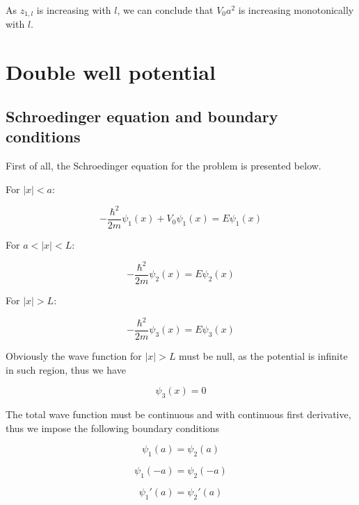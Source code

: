 \documentclass{article}
\begin{document}
As \(z_{1,l} \) is increasing with \(l\), we can conclude that \(V_0a^2\) is increasing monotonically with \(l\).

\section{Double well potential}

\subsection{Schroedinger equation and boundary conditions}
First of all, the Schroedinger equation for the problem is presented below.

For \(\left|x\right| < a\):

\begin{equation}
\label{eq:schr1}
-\frac{\hbar^2}{2m}\psi_{1}(x) + V_{0}\psi_{1}(x) = E\psi_{1}(x)
\end{equation}

For \(a < \left|x\right| < L\):

\begin{equation}
\label{eq:schr2}
-\frac{\hbar^2}{2m}\psi_{2}(x) = E\psi_{2}(x)
\end{equation}

For \(\left|x\right| > L\):

\begin{equation}
\label{eq:schr3}
-\frac{\hbar^2}{2m}\psi_{3}(x) = E\psi_{3}(x)
\end{equation}

Obviously the wave function for \(\left|x\right| > L\) must be null, as the potential is infinite in such region, thus we have

\begin{equation}
\psi_{3}(x) = 0
\end{equation}

The total wave function must be continuous and with continuous first derivative, thus we impose the following boundary conditions

\begin{equation}
\label{eq:continuity}
\psi_{1}(a) =  \psi_{2}(a)
\end{equation}

\begin{equation}
\psi_{1}(-a) =  \psi_{2}(-a)
\end{equation}

\begin{equation}
\label{eq:continuity_derivative}
\psi_{1}'(a) =  \psi_{2}'(a)
\end{equation}
\end{document}
